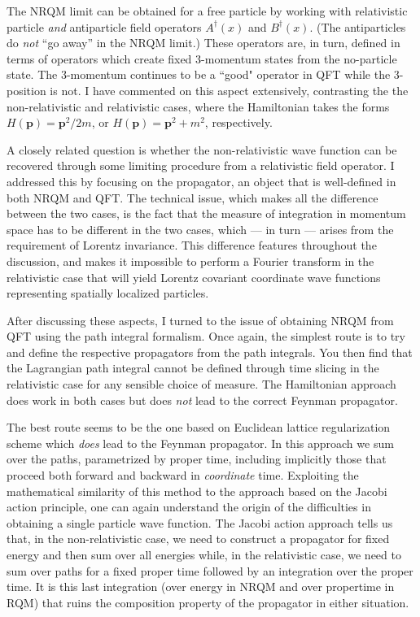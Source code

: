\documentclass[12pt]{article}
\begin{document}
The NRQM limit can be obtained for a free particle by working with relativistic particle \textit{and} antiparticle field operators
$A^\dagger(x)$ and $B^\dagger(x)$. (The antiparticles do \textit{not} ``go away'' in the NRQM limit.) These operators are, in turn, defined in terms of operators which create fixed 3-momentum states from the no-particle state. The 3-momentum continues to be a ``good" operator in QFT while the 3-position is not. I have commented on this aspect extensively, contrasting  the 
the non-relativistic and relativistic cases, where the Hamiltonian takes the forms $H(\bm{p}) = \bm{p}^2 /2m$, or $H(\bm{p}) = \bm{p}^2 + m^2$, respectively. 

A closely related question is whether the non-relativistic wave function can be recovered through some limiting
procedure from a relativistic field operator. I addressed this  by focusing
on the propagator, an object that is well-defined in both NRQM and QFT. The technical issue, which makes all the difference between the two cases, is the fact that the measure of integration in momentum space has to be different in the two cases, which --- in turn --- arises from the requirement of Lorentz invariance.  This difference features  throughout the discussion, and makes it 
 impossible to perform a Fourier transform in the relativistic
case that will yield Lorentz covariant coordinate wave functions  representing spatially localized
particles.  

After discussing these aspects, I turned to the   issue of obtaining NRQM from QFT using the path integral formalism. Once again, the simplest route is to try and define the respective propagators from the path integrals. You then find that  the Lagrangian path integral cannot be defined through time slicing  in the relativistic
case for any sensible choice of measure. The Hamiltonian approach does work in both cases but does \textit{not} lead to the correct Feynman propagator.  

The best route seems to be the one based on  Euclidean lattice regularization scheme which \textit{does} lead to the Feynman propagator. In this approach we sum over the paths, parametrized
 by proper time,  including implicitly those that proceed both forward and backward in \textit{coordinate}
time. Exploiting the mathematical similarity of this method to  the approach based on the Jacobi action principle, one can again understand the origin of the difficulties in obtaining a single particle wave function. The Jacobi action approach tells us that, in the non-relativistic case, we need to 
construct  a propagator for fixed energy and then  sum over all energies while, in  the relativistic case, we need to sum over 
paths  for a fixed proper time followed by an integration over the proper time. It is
this last integration (over energy in NRQM and over propertime in RQM) that ruins the composition property of the propagator in either situation. 
\end{document}
